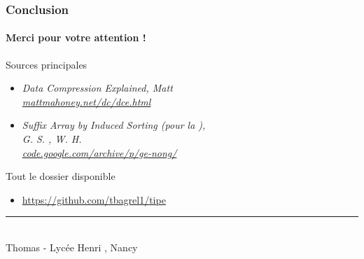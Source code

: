 \documentclass{beamer}
\newcommand{\tech}[1]{{\small \sc{#1}}}
\newcommand{\relief}[1]{{\color{structureTextColor} #1}}
\newcommand{\blue}[1]{{\color{regularblue} #1}}
\theoremstyle{theoreme}
\begin{document}






\begin{frame}
  \frametitle{Conclusion}
  \framesubtitle{Merci pour votre attention !}

  \relief{Sources principales}
  \begin{itemize}
    \item \it{Data Compression Explained}, Matt  \\
    \url{mattmahoney.net/dc/dce.html}
    \item \it{Suffix Array by Induced Sorting} (pour la \tech{bwt}),\\ G. S. , W. H. \\
    \url{code.google.com/archive/p/ge-nong/}
  \end{itemize}

  \relief{Tout le dossier disponible}
  \begin{itemize}
     \item {\large \url{https://github.com/tbagrel1/tipe}}
   \end{itemize}

  \begin{center}
    \blue{\rule{0.8\linewidth}{2pt}} \\
    {\small Thomas  - Lycée Henri , Nancy}
  \end{center}

\end{frame}
\end{document}
